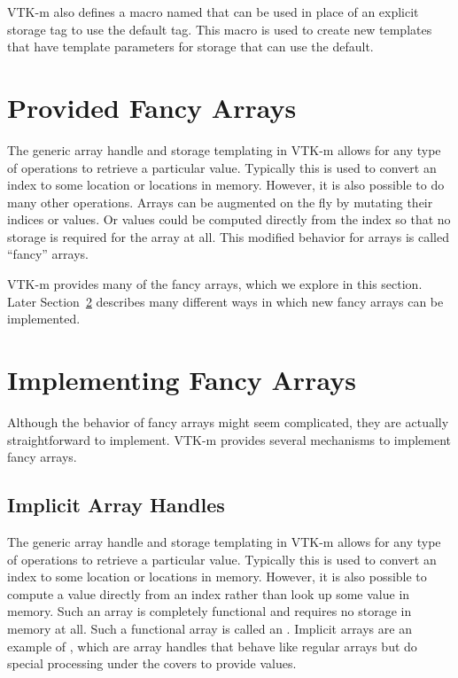 
VTK-m also defines a macro named 
that can be used in place of an explicit storage tag to use the
default tag. This macro is used to create new templates that have template
parameters for storage that can use the default.



\section{Provided Fancy Arrays}
\label{sec:ProvidedFancyArrays}

The generic array handle and storage templating in VTK-m allows for
any type of operations to retrieve a particular value. Typically this is
used to convert an index to some location or locations in memory. However,
it is also possible to do many other operations. Arrays can be augmented on
the fly by mutating their indices or values. Or values could be computed
directly from the index so that no storage is required for the array at
all. This modified behavior for arrays is called ``fancy'' arrays.

VTK-m provides many of the fancy arrays, which we explore in this section.
Later Section~\ref{sec:ImplementingFancyArrays} describes many different
ways in which new fancy arrays can be implemented.



\section{Implementing Fancy Arrays}
\label{sec:ImplementingFancyArrays}

Although the behavior of fancy arrays might seem complicated, they are
actually straightforward to implement. VTK-m provides several mechanisms to
implement fancy arrays.

\subsection{Implicit Array Handles}


The generic array handle and storage templating in VTK-m allows for
any type of operations to retrieve a particular value. Typically this is
used to convert an index to some location or locations in memory. However,
it is also possible to compute a value directly from an index rather than
look up some value in memory. Such an array is completely functional and
requires no storage in memory at all. Such a functional array is called an
. Implicit arrays are an example of
, which are array handles that behave like
regular arrays but do special processing under the covers to provide
values.

